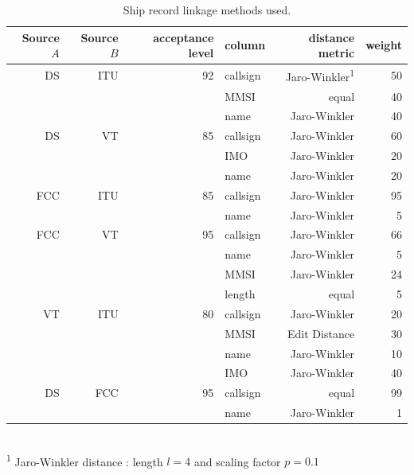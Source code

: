 \begin{table}[htbp]
  \caption[Ship record linkage methods]{Ship record linkage methods used.}
  \ssp
  \begin{tabular}{rrrlrr}
    \hline
    Source $A$ & Source $B$ & acceptance level & column & distance metric & weight \\
    \hline
     DS & ITU & 92 & callsign & Jaro-Winkler\textsuperscript{1} & 50 \\
        &     &    & MMSI & equal & 40 \\
        &     &    & name & Jaro-Winkler & 40 \\
     DS &  VT & 85 & callsign & Jaro-Winkler & 60 \\
        &     &    & IMO & Jaro-Winkler & 20 \\
        &     &    & name & Jaro-Winkler & 20 \\
    FCC & ITU & 85 & callsign & Jaro-Winkler & 95 \\
        &     &    & name & Jaro-Winkler & 5 \\
    FCC &  VT & 95 & callsign & Jaro-Winkler & 66 \\
        &     &    & name & Jaro-Winkler & 5 \\
        &     &    & MMSI & Jaro-Winkler & 24 \\
        &     &    & length & equal & 5 \\
     VT & ITU & 80 & callsign & Jaro-Winkler & 20 \\
        &     &    & MMSI & Edit Distance & 30 \\
        &     &    & name & Jaro-Winkler & 10 \\
        &     &    & IMO & Jaro-Winkler & 40 \\
     DS & FCC & 95 & callsign & equal & 99 \\
        &     &    & name & Jaro-Winkler& 1 \\
  \end{tabular}
  \\
  \textsuperscript{1} Jaro-Winkler distance \citep{winkler1990string}: length $l = 4$ and scaling factor $p = 0.1$
  \label{table:ships-record-linkage-methods}
\end{table}


